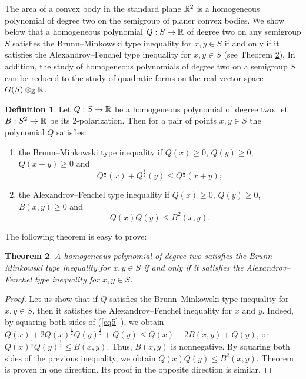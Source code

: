 \documentclass[11pt]{article}
\theoremstyle{plain}
\newtheorem{theorem}{Theorem}[section]
\theoremstyle{definition}
\newtheorem{definition}[theorem]{Definition}
\begin{document}
The area of a convex body in the standard plane $\Bbb R^2$ is a homogeneous  polynomial of degree two on the semigroup of planer convex bodies. We show below that
a  homogeneous polynomial $Q:S\to \Bbb R$  of degree two on any  semigroup $S$  satisfies the Brunn--Minkowski type inequality for  $x,y\in S$ if and only if it satisfies the  Alexandrov--Fenchel type inequality for $x,y\in S$ (see Theorem \ref{B-MA-F}).
In addition, the study of  homogeneous  polynomials  of degree two on a semigroup $S$ can be reduced to the study of quadratic forms on the real vector space $G(S)\otimes_{\Bbb Z} \Bbb R$.

\begin{definition}\label{polynomial B-Mxy}
Let $Q:S\to \Bbb R$ be a homogeneous polynomial of degree two, let $B:S^2\to \Bbb R$ be its $2$-polarization. Then for a pair of points  $x,y\in S $ the polynomial $Q$ satisfies:
\begin{enumerate}
\item the Brunn--Minkowski type inequality  if $Q(x)\geq 0$, $Q(y)\geq 0$, $Q(x+y)\geq 0 $ and
\begin{equation}\label{eq5}
Q^{\frac{1}{2}}(x) + Q^{\frac{1}{2}}(y) \leq Q^{\frac{1}{2}}(x+y);
\end{equation}
\item the  Alexandrov--Fenchel  type inequality if $Q(x)\geq 0$, $Q(y)\geq 0$,  $B(x,y)\geq 0$ and
\begin{equation}\label{eq6}
  Q(x)Q(y)\leq B^2(x,y).
\end{equation}
\end{enumerate}
\end{definition}

The following theorem is  easy to prove:


\begin{theorem}\label{B-MA-F} A homogeneous polynomial of degree two   satisfies the Brunn--Minkowski type inequality for $x, y \in S$ if and only if it
satisfies the Alexandrov--Fenchel  type inequality for $x, y\in S$.
\end{theorem}

\begin{proof} Let us show that  if  $Q$ satisfies the Brunn--Minkowski  type inequality for $x,y\in S$, then it satisfies the Alexandrov--Fenchel inequality for $x$ and  $y$.
Indeed,  by squaring  both sides of  (\ref{eq5} ), we  obtain $Q(x) + 2 Q(x)^{\frac{1}{2}}Q(y)^{\frac {1}{2}} + Q(y)\leq Q(x)+2B(x,y)+ Q(y)$, or $Q(x)^{\frac{1}{2}}Q(y)^{\frac {1}{2}}\leq B(x,y)$. Thus, $B(x,y)$ is nonnegative. By squaring  both sides of the previous inequality, we obtain  $Q(x)Q(y)\leq B^2(x,y)$.  Theorem is proven in one direction. Its proof in the opposite direction is similar.
\end{proof}
\end{document}
